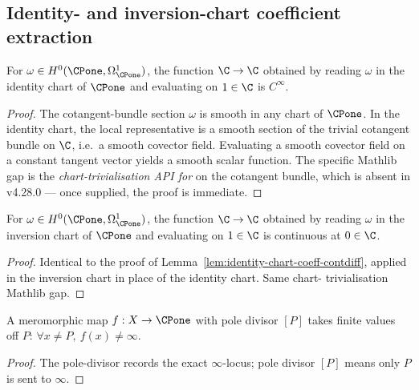 \subsection{Identity- and inversion-chart coefficient extraction}
\label{sec:chart-coeff-extraction}

\begin{lemma}
\label{lem:identity-chart-coeff-contdiff}
For \(\omega\in H^{0}(\CPone,\Omega^{1}_{\CPone})\), the function
\(\C\to\C\) obtained by reading \(\omega\) in the identity chart
of \(\CPone\) and evaluating on \(1\in\C\) is \(C^{\infty}\).
\leanok
\end{lemma}
\begin{proof}\leanok
The cotangent-bundle section \(\omega\) is smooth in any chart of
\(\CPone\). In the identity chart, the local representative is a
smooth section of the trivial cotangent bundle on \(\C\), i.e.\ a
smooth covector field. Evaluating a smooth covector field on a
constant tangent vector yields a smooth scalar function. The
specific Mathlib gap is the \emph{chart-trivialisation API for
} on the cotangent bundle, which is absent
in v4.28.0 --- once supplied, the proof is immediate.
\end{proof}

\begin{lemma}
\label{lem:inversion-chart-coeff-continuous-at-zero}
For \(\omega\in H^{0}(\CPone,\Omega^{1}_{\CPone})\), the function
\(\C\to\C\) obtained by reading \(\omega\) in the inversion chart
of \(\CPone\) and evaluating on \(1\in\C\) is continuous at
\(0\in\C\).
\leanok
\end{lemma}
\begin{proof}\leanok
Identical to the proof of
Lemma~\ref{lem:identity-chart-coeff-contdiff}, applied in the
inversion chart in place of the identity chart. Same chart-
trivialisation Mathlib gap.
\end{proof}

\begin{lemma}
\label{lem:meromorphic-no-infty-off-pole}

A meromorphic map \(f:X\to\CPone\) with pole divisor \([P]\) takes
finite values off \(P\): \(\forall x\neq P,\ f(x)\neq\infty\).
\leanok
\end{lemma}
\begin{proof}\leanok
The pole-divisor records the exact \(\infty\)-locus; pole divisor
\([P]\) means only \(P\) is sent to \(\infty\).
\end{proof}

